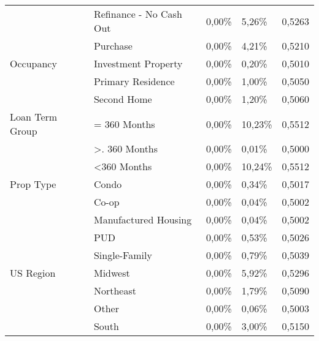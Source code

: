\begin{longtable}{ l p{5.5cm} l l l }
                            & Refinance - No Cash Out                            & 0,00\%     & 5,26\%  & 0,5263 \\
                            & Purchase                                           & 0,00\%     & 4,21\%  & 0,5210 \\\hline
Occupancy                   & Investment Property                                & 0,00\%     & 0,20\%  & 0,5010 \\
                            & Primary Residence                                  & 0,00\%     & 1,00\%  & 0,5050 \\
                            & Second Home                                        & 0,00\%     & 1,20\%  & 0,5060 \\\hline
Loan Term Group             & = 360 Months                                       & 0,00\%     & 10,23\% & 0,5512 \\
                            & \textgreater{}. 360 Months                         & 0,00\%     & 0,01\%  & 0,5000 \\
                            & \textless 360 Months                               & 0,00\%     & 10,24\% & 0,5512 \\\hline
Prop Type                   & Condo                                              & 0,00\%     & 0,34\%  & 0,5017 \\
                            & Co-op                                              & 0,00\%     & 0,04\%  & 0,5002 \\
                            & Manufactured Housing                               & 0,00\%     & 0,04\%  & 0,5002 \\
                            & PUD                                                & 0,00\%     & 0,53\%  & 0,5026 \\
                            & Single-Family                                      & 0,00\%     & 0,79\%  & 0,5039 \\\hline
US Region                   & Midwest                                            & 0,00\%     & 5,92\%  & 0,5296 \\
                            & Northeast                                          & 0,00\%     & 1,79\%  & 0,5090 \\
                            & Other                                              & 0,00\%     & 0,06\%  & 0,5003 \\
                            & South                                              & 0,00\%     & 3,00\%  & 0,5150 \\

\end{longtable}
